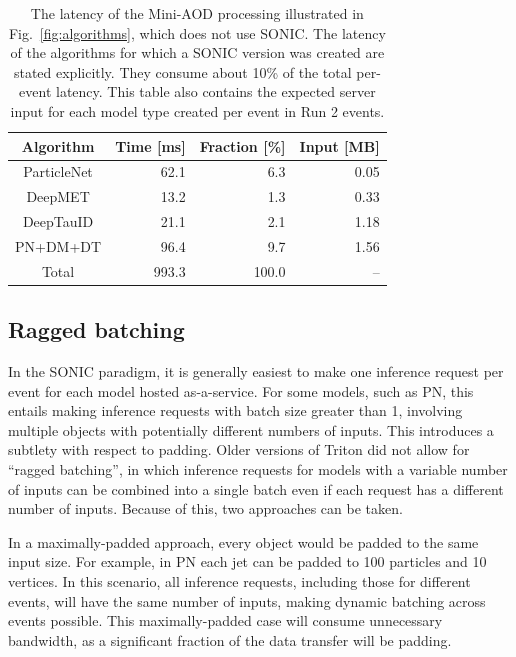 \begin{table}[ht!]
\begin{center}
\begin{tabular}{c r r r}
 Algorithm & \multicolumn{1}{c}{Time [ms]} & \multicolumn{1}{c}{Fraction [\%]} & \multicolumn{1}{c}{Input [MB]}\\ %
 \hline
 ParticleNet & 62.1 & 6.3 & 0.05 \\
 DeepMET & 13.2 & 1.3 & 0.33 \\
 DeepTauID & 21.1 & 2.1 & 1.18 \\
 \hline
 PN+DM+DT & 96.4 & 9.7 & 1.56 \\ 
 \hline
 Total & 993.3 & 100.0 & -- \\ 
\end{tabular}
\caption{The latency of the Mini-AOD processing illustrated in Fig.~\ref{fig:algorithms}, which does not use SONIC. The latency of the algorithms for which a SONIC version was created are stated explicitly. They consume about 10\% of the total per-event latency. This table also contains the expected server input for each model type created per event in Run 2 \ttbar events.}
\label{table:SONIC_Algos}
\end{center}
\end{table}


\subsection{Ragged batching}
\label{sec:ragged}

In the SONIC paradigm, it is generally easiest to make one inference request per event for each model hosted as-a-service. For some models, such as PN, this entails making inference requests with batch size greater than 1, involving multiple objects with potentially different numbers of inputs. This introduces a subtlety with respect to padding. Older versions of Triton did not allow for ``ragged batching'', in which inference requests for models with a variable number of inputs can be combined into a single batch even if each request has a different number of inputs. Because of this, two approaches can be taken.

In a maximally-padded approach, every object would be padded to the same input size. For example, in PN each jet can be padded to 100 particles and 10 vertices. In this scenario, all inference requests, including those for different events, will have the same number of inputs, making dynamic batching across events possible. This maximally-padded case will consume unnecessary bandwidth, as a significant fraction of the data transfer will be padding.

